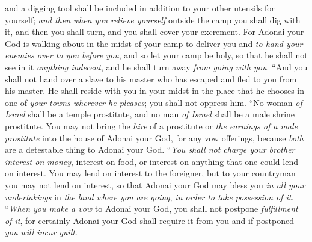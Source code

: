 \begin{biblechapter}
\verse and a digging tool shall be included in addition to your other utensils for yourself; \textit{and then} \textit{when you relieve yourself} outside the camp you shall dig with it, and then you shall turn, and you shall cover your excrement.
\verse For Adonai your God is walking about in the midst of your camp to deliver you and \textit{to hand your enemies over to you before you}, and so let your camp be holy, so that he shall not see in it \textit{anything indecent}, and he shall turn away \textit{from going with you}.
\verse “And you shall not hand over a slave to his master who has escaped and fled to you from his master.
\verse He shall reside with you in your midst in the place that he chooses in one of \textit{your towns wherever he pleases}; you shall not oppress him.
\verse “No woman \textit{of Israel} shall be a temple prostitute, and no man \textit{of Israel} shall be a male shrine prostitute.
\verse You may not bring the \textit{hire} of a prostitute or \textit{the earnings of a male prostitute} into the house of Adonai your God, for any vow offerings, because \textit{both} are a detestable thing to Adonai your God.
\verse “\textit{You shall not charge your brother interest on money}, interest on food, or interest on anything that one could lend on interest.
\verse You may lend on interest to the foreigner, but to your countryman you may not lend on interest, so that Adonai your God may bless you \textit{in all your undertakings} in \textit{the land where you are going}, \textit{in order to take possession of it}.
\verse “\textit{When you make a vow} to Adonai your God, you shall not postpone \textit{fulfillment of it}, for certainly Adonai your God shall require it from you and if postponed \textit{you will incur guilt}.

\end{biblechapter}
